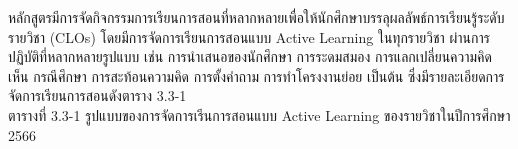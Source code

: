 



หลักสูตรมีการจัดกิจกรรมการเรียนการสอนที่หลากหลายเพื่อให้นักศึกษาบรรลุผลลัพธ์การเรียนรู้ระดับรายวิชา (CLOs) โดยมีการจัดการเรียนการสอนแบบ Active Learning ในทุกรายวิชา ผ่านการปฏิบัติที่หลากหลายรูปแบบ เช่น การนำเสนอของนักศึกษา การระดมสมอง การแลกเปลี่ยนความคิดเห็น กรณีศึกษา การสะท้อนความคิด การตั้งคำถาม การทำโครงงานย่อย เป็นต้น ซึ่งมีรายละเอียดการจัดการเรียนการสอนดังตาราง 3.3-1\\
\noindent ตารางที่ 3.3-1 รูปแบบของการจัดการเรีนการสอนแบบ Active Learning ของรายวิชาในปีการศึกษา 2566

